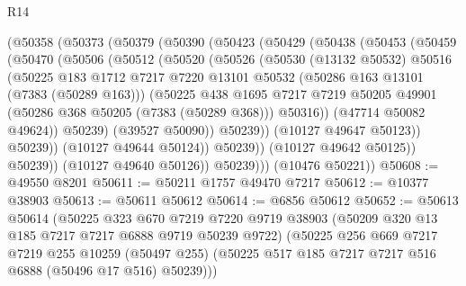 \begin{lexlean}{R14}
\begin{coremodule}
            (@50358
              (@50373
                (@50379
                  (@50390
                    (@50423
                      (@50429
                        (@50438
                          (@50453
                            (@50459
                              (@50470
                                (@50506
                                  (@50512
                                    (@50520
                                      (@50526
                                        (@50530
                                          (@13132 @50532)
                                          @50516
                                          (@50225
                                            @183
                                            @1712
                                            @7217
                                            @7220
                                            @13101
                                            @50532
                                            (@50286 @163 @13101 (@7383 (@50289 @163)))
                                            (@50225
                                              @438
                                              @1695
                                              @7217
                                              @7219
                                              @50205
                                              @49901
                                              (@50286 @368 @50205 (@7383 (@50289 @368)))
                                              @50316))
                                          (@47714 @50082 @49624))
                                        @50239)
                                      (@39527 @50090))
                                    @50239))
                                (@10127 @49647 @50123))
                              @50239))
                          (@10127 @49644 @50124))
                        @50239))
                    (@10127 @49642 @50125))
                  @50239))
              (@10127 @49640 @50126))
            @50239)))
      (@10476 @50221))
@50608 := @49550 @8201
@50611 := @50211 @1757 @49470 @7217
@50612 := @10377 @38903
@50613 := @50611 @50612
@50614 := @6856 @50612
@50652 := @50613
    @50614
    (@50225
      @323
      @670
      @7219
      @7220
      @9719
      @38903
      (@50209 @320 @13 @185 @7217 @7217 @6888 @9719 @50239 @9722)
      (@50225
        @256
        @669
        @7217
        @7219
        @255
        @10259
        (@50497 @255)
        (@50225 @517 @185 @7217 @7217 @516 @6888 (@50496 @17 @516) @50239)))

\end{coremodule}
\end{lexlean}
